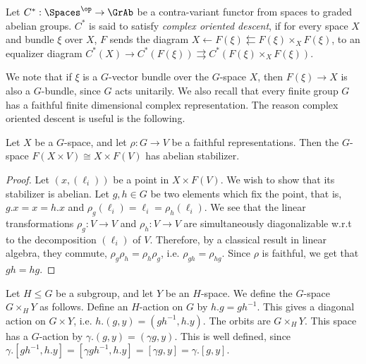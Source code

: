 \begin{definition}
	Let $C^*: \Spaces^\op \to \GrAb$ be a contra-variant functor from spaces to graded abelian groups.
	$C^*$ is said to satisfy \emph{complex oriented descent},
	if for every space $X$ and bundle $\xi$ over $X$, $F$ sends the diagram
	$X \leftarrow F\left(\xi\right) \leftleftarrows F\left(\xi\right) \times_X F\left(\xi\right)$,
	to an equalizer diagram
	$C^*\left(X\right) \to C^*\left(F\left(\xi\right)\right) \rightrightarrows C^*\left(F\left(\xi\right) \times_X F\left(\xi\right)\right)$.
\end{definition}

We note that if $\xi$ is a $G$-vector bundle over the $G$-space $X$, then $F\left(\xi\right) \to X$ is also a $G$-bundle, since $G$ acts unitarily.
We also recall that every finite group $G$ has a faithful finite dimensional complex representation.
The reason complex oriented descent is useful is the following.

\begin{proposition}\label{faithful-triv-bundle}
	Let $X$ be a $G$-space, and let $\rho: G \to V$ be a faithful representations.
	Then the $G$-space $F\left(X \times V\right) \cong X \times F\left(V\right)$ has abelian stabilizer.
\end{proposition}

\begin{proof}
	Let $\left(x, \left(\ell_i\right)\right)$ be a point in $X \times F\left(V\right)$.
	We wish to show that its stabilizer is abelian.
	Let $g,h \in G$ be two elements which fix the point, that is, $g.x = x = h.x$ and $\rho_g\left(\ell_i\right) = \ell_i = \rho_h\left(\ell_i\right)$.
	We see that the linear transformations $\rho_g: V \to V$ and $\rho_h: V \to V$ are simultaneously diagonalizable w.r.t to the decomposition $\left(\ell_i\right)$ of $V$.
	Therefore, by a classical result in linear algebra, they commute, $\rho_g \rho_h = \rho_h \rho_g$, i.e. $\rho_{gh} = \rho_{hg}$.
	Since $\rho$ is faithful, we get that $gh = hg$.
\end{proof}

\begin{definition}
	Let $H \leq G$ be a subgroup, and let $Y$ be an $H$-space.
	We define the $G$-space $G \times_H Y$ as follows.
	Define an $H$-action on $G$ by $h.g = gh^{-1}$.
	This gives a diagonal action on $G \times Y$, i.e. $h.\left(g, y\right) = \left(g h^{-1}, h.y\right)$.
	The orbits are $G \times_H Y$.
	This space has a $G$-action by $\gamma. \left(g, y\right) = \left(\gamma g, y\right)$.
	This is well defined, since
	$
	\gamma. \left[g h^{-1}, h.y\right]
	= \left[\gamma g h^{-1}, h.y\right]
	= \left[\gamma g, y\right]
	= \gamma . \left[g, y\right]
	$.
\end{definition}

